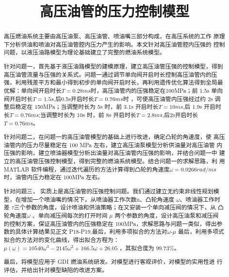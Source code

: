 \documentclass{cumcmthesis}
\title{高压油管的压力控制模型}
\begin{document}
 \maketitle
 \begin{abstract}
高压燃油系统主要由高压油泵、高压油管、喷油嘴三部分构成，在高压系统的工作 原理下分析供油和喷油对高压油管腔内压力产生的影响。本文针对高压油管腔内压强的 控制问题，以液压油路模型为理论基础建立了完整的燃油系统模型。
\vspace{10pt}

{\heiti 针对问题一}，首先基于液压油路模型的建模原理，建立高压油管压强的控制模型，得到高压油管流量与压强的关系式。问题一通过调节单向阀开启时长控制高压油管内的压强，利用{\heiti 残差平方和最小}得到初步的单向阀开启时长，再利用{\heiti 遗传优化算法}得到全局最优解：单向阀开启时长$T=0.28ms$时，高压油管内的压强稳定在100MPa；前 1.5s 单向阀开启时长$T=1.5s$,后0.5s开启时长$T=0.76ms$时 ，可使高压油管内压强经过约 2s 调整后稳定在 150MPa；当调整时长为 5s 时，前 3.1s 开启时长$T=10ms$,后 1.9s 开启时长$T=0.76ms$;当调整时长为 10s 时，前 8s 开启时长$T=2.8ms$,后2s开启时长$T=0.76ms$。
\vspace{10pt}

{\heiti 针对问题二}，在问题一的高压油管模型的基础上进行改进，确定凸轮的角速度，使 高压油管内的压力尽量稳定在 100 MPa 左右，建立高压油泵模型分析供油量对高压油管 内压强的影响，建立喷油器模型分析出油量对高压油管内压强的影响，并结合问题一中 建立的{\heiti 高压油管压强控制模型}，得到完整的燃油系统模型。结合问题一的求解思路，利 用 MATLAB 软件编程，通过迭代遍历的方法计算得到凸轮的角速度$\omega =0.0266rad/ms$时，油管内压力稳定在 100MPa 左右。
\vspace{10pt}

{\heiti 针对问题三}， 实质上是高压油管的压强控制问题。我们通过建立{\heiti 无约束非线性规划模型}，在增加一个喷油嘴的情况下，从喷油器工作次数n、凸轮角速度 $\omega$、喷油器工作时差 $\tau$三个参数的角度，设计喷油和供油策略；在又安装一个单向减压阀的情况下，从 凸轮角速度$\omega$ 、单向减压阀每次的打开时间 $\mu$ 两个参数的角度，设计高压油泵和减压阀 的控制方案，保证高压油管内的压强稳定在 100MPa，求解思路与问题一类似，得出参 数的具体计算结果见正文 P18-P19,最后，利用多项拟合的方法对$\omega$-$\mu$ 最后，利用多项式拟合的方法对的变化曲线，得出拟合方程为：$\mu(\omega)=10540\omega^3-2145\omega^2+166.5\omega+26.05$ ，其拟合度为 99.73\%。
\vspace{10pt}

最后，将模型应用于 GDI 燃油系统研发。对模型进行客观评价，对模型的实用性进 行评估，并给出针对模型缺陷的改进方案。
\vspace{10pt}

\end{abstract}
\end{document}
